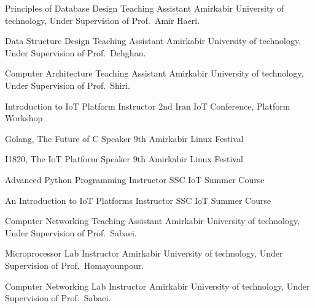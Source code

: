 \documentclass[]{friggeri-cv} %
\begin{document}
\begin{entrylist}
  {Principles of Database Design}
  {Teaching Assistant}
  {Amirkabir University of technology, Under Supervision of Prof.\ Amir Haeri.}


  {Data Structure Design}
  {Teaching Assistant}
  {Amirkabir University of technology, Under Supervision of Prof.\ Dehghan.}


  {Computer Architecture}
  {Teaching Assistant}
  {Amirkabir University of technology, Under Supervision of Prof.\ Shiri.}


  {Introduction to IoT Platform}
  {Instructor}
  {2nd Iran IoT Conference, Platform Workshop}


  {Golang, The Future of C}
  {Speaker}
  {9th Amirkabir Linux Festival}


  {I1820, The IoT Platform}
  {Speaker}
  {9th Amirkabir Linux Festival}


  {Advanced Python Programming}
  {Instructor}
  {SSC IoT Summer Course}


  {An Introduction to IoT Platforms}
  {Instructor}
  {SSC IoT Summer Course}


  {Computer Networking}
  {Teaching Assistant}
  {Amirkabir University of technology, Under Supervision of Prof.\ Sabaei.}


  {Microprocessor Lab}
  {Instructor}
  {Amirkabir University of technology, Under Supervision of Prof.\ Homayounpour.}


  {Computer Networking Lab}
  {Instructor}
  {Amirkabir University of technology, Under Supervision of Prof.\ Sabaei.}


\end{entrylist}
\end{document}
